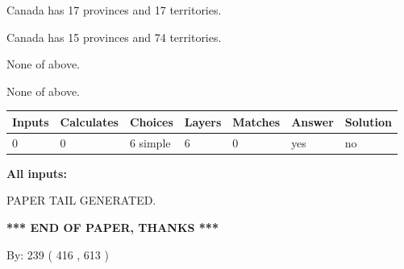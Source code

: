 \documentclass[12pt]{article}
\begin{document}
 
Canada has  17 provinces and  17 territories.
 
 
Canada has  15 provinces and  74 territories.
 
 
 None of above.
 
 
\noindent{}
 
 
 None of above.
 
 
\noindent{}
 
 
   
   
   
   
\noindent\begin{tabular}{|l|l|l|l|l|l|l|}
 \hline
Inputs & Calculates & Choices & Layers & Matches & Answer & Solution \\ \hline
 0  & 
 0  & 
 6
  simple  
  & 
 6  & 
 0  & 
  yes & 
  no 
  \\ \hline
 \end{tabular}
   
   
   
   
\noindent{}
   
   
   
   
\noindent\vspace{0.1in}\hspace{-0.08in} {\textbf{\Large{All inputs: }}}
   
   
   
   
   
   
 \vspace{0.2in}
 
   
   
\vspace{2.0in} PAPER TAIL GENERATED.
   
   
   
   
\vspace{1.0in} 
{\textbf{\large{ *** END OF PAPER, THANKS *** }}} 
   
   
\hspace{1.0in} By: 
 239 ( 416 ,  613 )
   
   
   
   
\newpage 
\setcounter{page}{ 
   460001 } 
   
   
   
\end{document}
